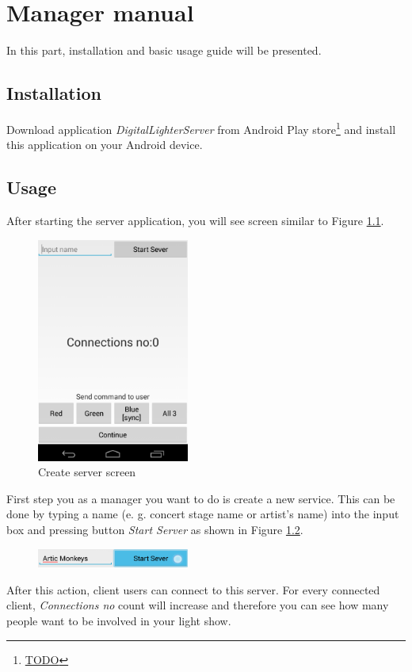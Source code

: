 \chapter{Manager manual}
In this part, installation and basic usage guide will be presented.
\section{Installation}
Download application \emph{DigitalLighterServer} from Android Play store\footnote{\url{TODO}} and install this application on your Android device.
\section{Usage}
After starting the server application, you will see screen similar to Figure \ref{fig:manual_server0}.
\begin{figure}[h]
	\centering
		\includegraphics[width=5cm]{appendix/server0.png}
	\caption{Create server screen}
	\label{fig:manual_server0}
\end{figure}

First step you as a manager you want to do is create a new service.
This can be done by typing a name (e. g. concert stage name or artist's name) into the input box and pressing button \emph{Start Server} as shown in Figure \ref{fig:manual_server1}.

\begin{figure}[h]
	\centering
		\includegraphics[width=5cm]{appendix/server2.png}
	\caption{}
	\label{fig:manual_server1}
\end{figure}

After this action, client users can connect to this server.
For every connected client, \emph{Connections no} count will increase and therefore you can see how many people want to be involved in your light show.


